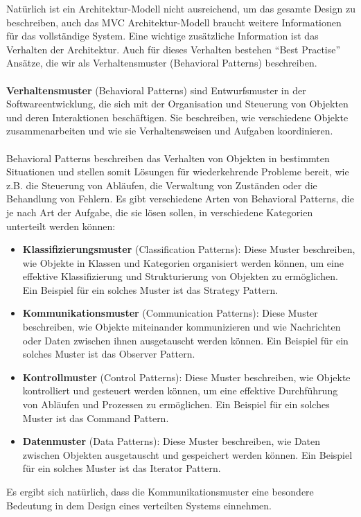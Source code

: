 Natürlich ist ein Architektur-Modell nicht ausreichend, um das gesamte Design zu beschreiben, auch das MVC Architektur-Modell braucht weitere Informationen für das vollständige System. Eine wichtige zusätzliche Information ist das Verhalten der Architektur. Auch für dieses Verhalten bestehen \enquote{Best Practise} Ansätze, die wir als Verhaltensmuster (Behavioral Patterns) beschreiben. 
\\\\
\textbf{Verhaltensmuster} (Behavioral Patterns) sind Entwurfsmuster in der Softwareentwicklung, die sich mit der Organisation und Steuerung von Objekten und deren Interaktionen beschäftigen. Sie beschreiben, wie verschiedene Objekte zusammenarbeiten und wie sie Verhaltensweisen und Aufgaben koordinieren.
\\\\
Behavioral Patterns beschreiben das Verhalten von Objekten in bestimmten Situationen und stellen somit Lösungen für wiederkehrende Probleme bereit, wie z.B. die Steuerung von Abläufen, die Verwaltung von Zuständen oder die Behandlung von Fehlern. Es gibt verschiedene Arten von Behavioral Patterns, die je nach Art der Aufgabe, die sie lösen sollen, in verschiedene Kategorien unterteilt werden können:
\begin{itemize}
\item \textbf{Klassifizierungsmuster} (Classification Patterns): Diese Muster beschreiben, wie Objekte in Klassen und Kategorien organisiert werden können, um eine effektive Klassifizierung und Strukturierung von Objekten zu ermöglichen. Ein Beispiel für ein solches Muster ist das Strategy Pattern.
\item \textbf{Kommunikationsmuster} (Communication Patterns): Diese Muster beschreiben, wie Objekte miteinander kommunizieren und wie Nachrichten oder Daten zwischen ihnen ausgetauscht werden können. Ein Beispiel für ein solches Muster ist das Observer Pattern.
\item \textbf{Kontrollmuster} (Control Patterns): Diese Muster beschreiben, wie Objekte kontrolliert und gesteuert werden können, um eine effektive Durchführung von Abläufen und Prozessen zu ermöglichen. Ein Beispiel für ein solches Muster ist das Command Pattern.
\item \textbf{Datenmuster} (Data Patterns): Diese Muster beschreiben, wie Daten zwischen Objekten ausgetauscht und gespeichert werden können. Ein Beispiel für ein solches Muster ist das Iterator Pattern.
\end{itemize}
Es ergibt sich natürlich, dass die Kommunikationsmuster eine besondere Bedeutung in dem Design eines verteilten Systems einnehmen. 
